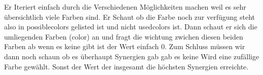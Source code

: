\documentclass{article}
\begin{document}
Er Iteriert einfach durch die Verschiedenen Möglichkeiten machen weil es sehr übersichtlich viele Farben sind. Er Schaut ob die Farbe noch zur verfügung steht also in possiblecolors gelisted ist und nicht usedcolors ist. Dann schaut er sich die umliegenden Farben (color) an und fragt die wichtung zwichen diesen beiden Farben ab wenn es keine gibt ist der Wert einfach 0. Zum Schluss müssen wir dann noch schaun ob es überhaupt Synergien gab gab es keine Wird eine zufällige Farbe gewählt. Sonst der Wert der insgesamt die höchsten Synergien erreichte.
\end{document}
